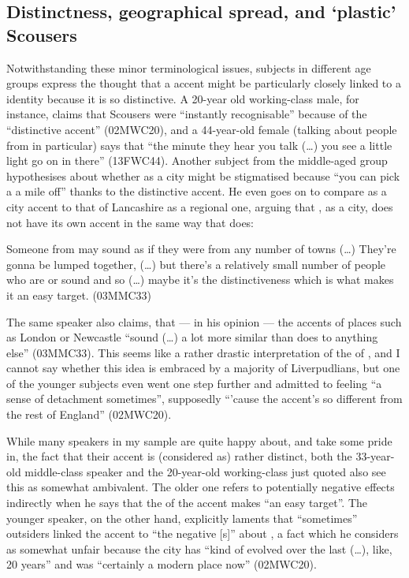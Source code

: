 \subsection{Distinctness, geographical spread, and `plastic' Scousers}

Notwithstanding these minor terminological issues, subjects in different age groups express the thought that a  accent might be particularly closely linked to a  identity because it is so distinctive.
A 20-year old working-class male, for instance, claims that Scousers were ``instantly recognisable'' because of the ``distinctive accent'' (02MWC20), and a 44-year-old female (talking about people from  in particular) says that ``the minute they hear you talk (\ldots) you see a little light go on in there'' (13FWC44).
Another subject from the middle-aged group hypothesises about whether  as a city might be stigmatised because ``you can pick a  a mile off'' thanks to the distinctive accent.
He even goes on to compare  as a city accent to that of Lancashire as a regional one, arguing that , as a city, does not have its own accent in the same way that  does:

\begin{example}
	Someone from  may sound as if they were from any number of towns (\ldots) They're gonna be lumped together, (\ldots) but there's a relatively small number of people who are  or sound  and so (\ldots) maybe it's the distinctiveness which is what makes it an easy target. (03MMC33)
\end{example}

The same speaker also claims, that --- in his opinion --- the accents of places such as London or Newcastle ``sound (\ldots) a lot more similar than  does to anything else'' (03MMC33).
This seems like a rather drastic interpretation of the  of , and I cannot say whether this idea is embraced by a majority of Liverpudlians, but one of the younger subjects even went one step further and admitted to feeling ``a sense of detachment sometimes'', supposedly ``'cause the accent's so different from the rest of England'' (02MWC20).

While many speakers in my sample are quite happy about, and take some pride in, the fact that their accent is (considered as) rather distinct, both the 33-year-old middle-class speaker and the 20-year-old working-class  just quoted also see this  as somewhat ambivalent.
The older one refers to potentially negative effects indirectly when he says that the  of the accent makes  ``an easy target''.
The younger speaker, on the other hand, explicitly laments that ``sometimes'' outsiders linked the accent to ``the negative [s]'' about , a fact which he considers as somewhat unfair because the city has ``kind of evolved over the last (\ldots), like, 20 years'' and was ``certainly a modern place now'' (02MWC20).

